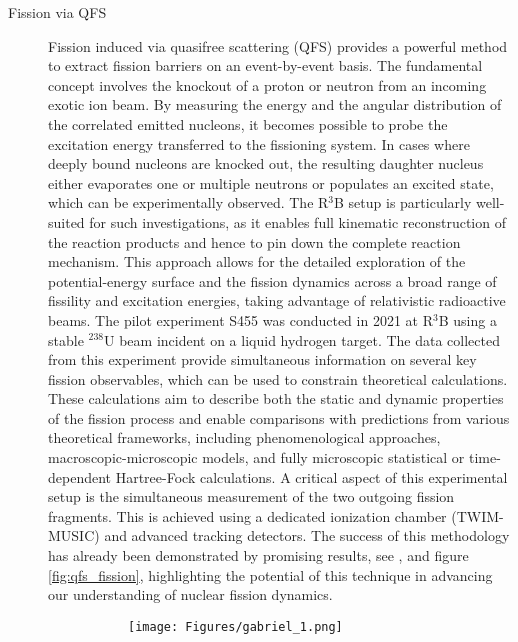 \begin{description}
\item[Fission via QFS]Fission induced via quasifree scattering (QFS) provides a powerful method to extract fission barriers on an event-by-event basis. The fundamental concept involves the knockout of a proton or neutron from an incoming exotic ion beam. By measuring the energy  and the angular distribution of the correlated emitted nucleons, it becomes possible to probe the excitation energy transferred to the fissioning system. In cases where deeply bound nucleons are knocked out, the resulting daughter nucleus either evaporates one or multiple neutrons or populates an excited state, which can be experimentally observed. The R$^3$B setup is particularly well-suited for such investigations, as it enables full kinematic reconstruction of the reaction products and hence to pin down the complete reaction mechanism. This approach allows for the detailed exploration of the potential-energy surface and the fission dynamics across a broad range of fissility and excitation energies, taking advantage of relativistic radioactive beams.\newline
The pilot experiment S455 was conducted in 2021 at R$^3$B using a stable $^{238}$U beam incident on a liquid hydrogen target. The data collected from this experiment provide simultaneous information on several key fission observables, which can be used to constrain theoretical calculations. These calculations aim to describe both the static and dynamic properties of the fission process and enable comparisons with predictions from various theoretical frameworks, including phenomenological approaches, macroscopic-microscopic models, and fully microscopic statistical or time-dependent Hartree-Fock calculations.\newline
A critical aspect of this experimental setup is the simultaneous measurement of the two outgoing fission fragments. This is achieved using a dedicated ionization chamber (TWIM-MUSIC) and advanced tracking detectors. The success of this methodology has already been demonstrated by promising results, see \cite{garcia2023study},\cite{grana2023fission} and figure \ref{fig:qfs_fission}, highlighting the potential of this technique in advancing our understanding of nuclear fission dynamics.
\begin{figure}[htpb]
    \centering
    \begin{subfigure}[b]{0.3\textwidth}
    \texttt{[image: Figures/gabriel\_1.png]} 
    \end{subfigure}
    \begin{subfigure}[b]{0.3\textwidth}

\end{subfigure}
\end{figure}
\end{description}
